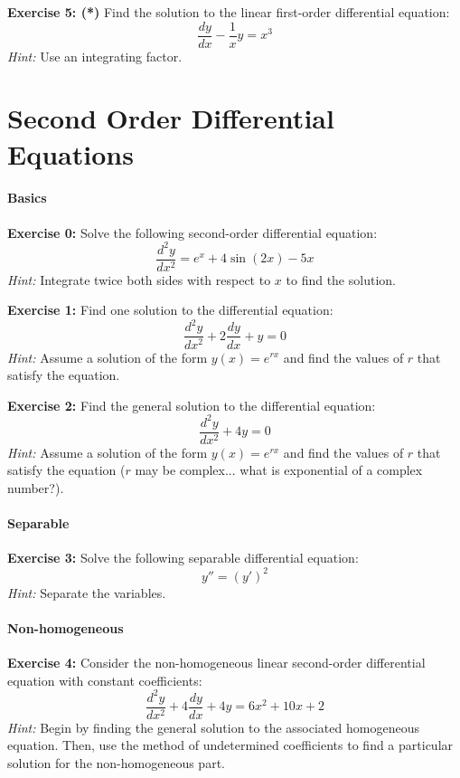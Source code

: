 \documentclass[]{article}
\begin{document}
	\textbf{Exercise 5: (*)}
	Find the solution to the linear first-order differential equation:
	$$
	\frac{dy}{dx} - \frac{1}{x}y = x^3
	$$
	\textit{Hint:} Use an integrating factor.
	
	
	
	\section{Second Order Differential Equations}
	\paragraph{Basics}\mbox{}
	
	\textbf{Exercise 0:}
	Solve the following second-order differential equation:
	$$
	\frac{d^2y}{dx^2} = e^x + 4\sin(2x) - 5x
	$$
	\textit{Hint:} Integrate twice both sides with respect to $x$ to find the solution.
	
	\textbf{Exercise 1:}
	Find one solution to the differential equation:
	$$
	\frac{d^2y}{dx^2} + 2\frac{dy}{dx} + y = 0
	$$
	\textit{Hint:} Assume a solution of the form $y(x) = e^{rx}$ and find the values of $r$ that satisfy the equation.
	
	\textbf{Exercise 2:}
	Find the general solution to the differential equation:
	$$
	\frac{d^2y}{dx^2} + 4y = 0
	$$
	\textit{Hint:} Assume a solution of the form $y(x) = e^{rx}$ and find the values of $r$ that satisfy the equation ($r$ may be complex... what is exponential of a complex number?).
	
	\paragraph{Separable}\mbox{}
	
	\textbf{Exercise 3:}
	Solve the following separable differential equation:
	$$y'' = (y')^2$$
	\textit{Hint:} Separate the variables.
	
	\paragraph{Non-homogeneous}\mbox{}
	
	\textbf{Exercise 4:}
	Consider the non-homogeneous linear second-order differential equation with constant coefficients:
	$$
	\frac{d^2y}{dx^2} + 4\frac{dy}{dx} + 4y = 6x^2 + 10x + 2
	$$
	\textit{Hint:} Begin by finding the general solution to the associated homogeneous equation. Then, use the method of undetermined coefficients to find a particular solution for the non-homogeneous part.
	
\end{document}

